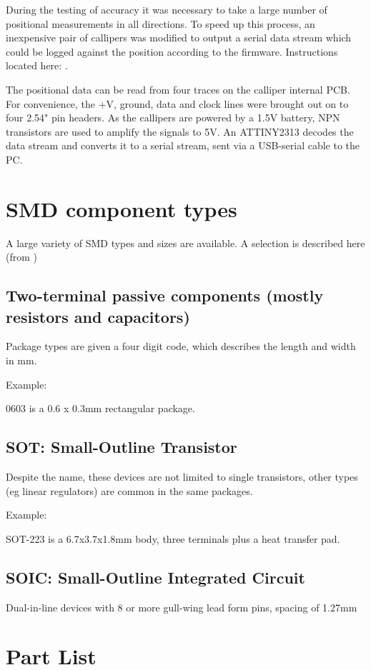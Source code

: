 During the testing of accuracy it was necessary to take a large number of positional measurements in all directions. 
To speed up this process, an inexpensive pair of callipers was modified to output a serial data stream which could be logged
against the position according to the firmware. Instructions located here: \cite{caliperdata}.

The positional data can be read from four traces on the calliper internal PCB. For convenience, the +V, ground, data and clock lines
were brought out on to four 2.54" pin headers. As the callipers are powered by a 1.5V battery, NPN transistors are used to amplify the signals to 5V. An ATTINY2313
decodes the data stream and converts it to a serial stream, sent via a USB-serial cable to the PC.

\newpage
\section{SMD component types}

A large variety of SMD types and sizes are available. A selection is described here (from \cite{smdwiki})

\subsection{Two-terminal passive components (mostly resistors and capacitors)}
Package types are given a four digit code, which describes the length and width in mm.

Example:

0603 is a 0.6 x 0.3mm rectangular package.

\subsection{SOT: Small-Outline Transistor}
Despite the name, these devices are not limited to single transistors, other types (eg linear regulators) are
common in the same packages.

Example:

SOT-223 is a 6.7x3.7x1.8mm body, three terminals plus a heat transfer pad.

\subsection{SOIC: Small-Outline Integrated Circuit}
Dual-in-line devices with 8 or more gull-wing lead form pins, spacing of 1.27mm

\newpage
\section{Part List}

